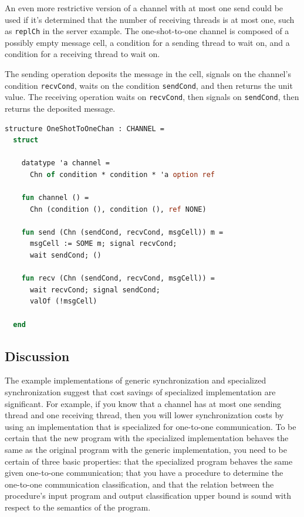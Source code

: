 \documentclass[10pt]{article}
\begin{document}
An even more restrictive version of a channel with at most one send could be used if it's
determined that the number of receiving threads is at most one,
such as \lstinline{replCh} in the server example.
The one-shot-to-one channel is
composed of a possibly empty message cell, a condition for a sending thread to wait on,
and a condition for a receiving thread to wait on.

The sending operation deposits the message in the cell, signals on the channel's condition \lstinline{recvCond},
waits on the condition \lstinline{sendCond}, and then returns the unit value.
The receiving operation waits on \lstinline{recvCond},
then signals on \lstinline{sendCond}, then returns the deposited message.

\begin{lstlisting}[language=ML, mathescape]
  structure OneShotToOneChan : CHANNEL =
  struct

    datatype 'a channel =
      Chn of condition * condition * 'a option ref

    fun channel () =
      Chn (condition (), condition (), ref NONE)

    fun send (Chn (sendCond, recvCond, msgCell)) m =
      msgCell := SOME m; signal recvCond;  
      wait sendCond; ()

    fun recv (Chn (sendCond, recvCond, msgCell)) =
      wait recvCond; signal sendCond;
      valOf (!msgCell)

  end
\end{lstlisting}

\subsection{Discussion}
The example implementations of generic synchronization and specialized synchronization suggest
that cost savings of specialized implementation are significant. For example, if you know that
a channel has at most one sending thread and one receiving thread, then you will
lower synchronization costs by
using an implementation that is specialized for one-to-one communication.  To be certain that
the new program with the specialized implementation behaves the same as the original program
with the generic implementation, you need to be certain of three basic properties: that the
specialized program behaves the same given one-to-one communication; that you have a procedure
to determine the one-to-one communication classification, and that the relation between the
procedure's input program and output classification upper bound is sound with respect to the
semantics of the program.  
\end{document}
